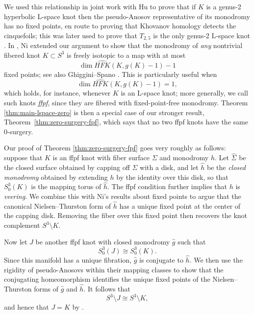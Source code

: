 \documentclass[11pt]{amsart}
\numberwithin{equation}{section}
\numberwithin{theorem}{section}
\theoremstyle{definition}
\newcommand\hfk{\mathit{HFK}}
\newcommand\hfkhat{\widehat{\hfk}}
\begin{document}
We used this relationship in joint work with Hu \cite{bhs-cinquefoil} to prove that if $K$ is a genus-2 hyperbolic L-space knot then the pseudo-Anosov representative of its monodromy has no fixed points, en route to proving  that Khovanov homology detects the cinquefoils; this was later used to prove that $T_{2,5}$ is the only  genus-2 L-space knot \cite{frw-cinquefoil}.     In \cite{ni-monodromy,ni-fixed}, Ni extended our argument to show  that the monodromy of \emph{any} nontrivial fibered knot  $K \subset S^3$ is freely isotopic to a map with at most
\begin{equation*}\label{eqn:dimminus1} \dim \hfkhat(K,g(K)-1) - 1 \end{equation*}
fixed points; see also Ghiggini--Spano \cite{ghiggini-spano}.  This is particularly useful when \[\dim \hfkhat(K,g(K)-1)=1,\] which holds, for instance, whenever $K$ is an L-space knot; more generally, we  call such  knots \emph{ffpf}, since they are fibered with fixed-point-free monodromy. Theorem \ref{thm:main-lspace-zero} is then a special case of our stronger result, Theorem~\ref{thm:zero-surgery-fpf}, which says  that no two ffpf knots have the same 0-surgery.

Our proof of Theorem \ref{thm:zero-surgery-fpf} goes very roughly as follows: suppose that $K$ is an ffpf knot with fiber surface  $\Sigma$ and monodromy $h$.  Let $\hat\Sigma$ be the closed surface obtained by capping  off $\Sigma$  with a disk, and let $\hat h$ be the \emph{closed  monodromy} obtained by extending $h$ by the identity over this  disk, so that $S^3_0(K)$ is the mapping torus of $\hat h$. The ffpf condition further implies  \cite{ni-exceptional} that $h$ is   \emph{veering}.  
We combine this with Ni's results about fixed points to argue that the canonical Nielsen--Thurston form of $\hat h$  has  a unique fixed point at the center of the capping disk. Removing the fiber over this fixed point then recovers the knot complement $S^3\setminus K$. 

Now let $J$ be another ffpf knot with closed monodromy $\hat g$ such  that \[S^3_0(J)\cong S^3_0(K).\] Since this manifold has a unique fibration, $\hat g$ is conjugate to $\hat h$. We  then use the rigidity of pseudo-Anosovs within their mapping classes \cite{flp} to show that the conjugating homeomorphism identifies the unique fixed points of the Nielsen--Thurston forms of $\hat g$ and $\hat h$. It follows that \[S^3\setminus J\cong S^3\setminus K,\]  and hence that $J=K$ by \cite{gordon-luecke-complement}. 
\end{document}
